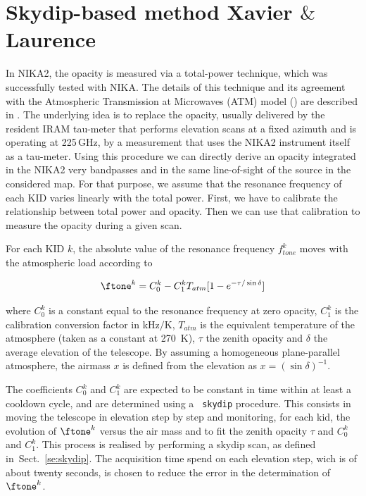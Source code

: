 \section{Skydip-based method {\color{blue} Xavier $\&$ Laurence}}
\label{se:skydip-method}

In NIKA2, the opacity is measured via a total-power technique, which was
successfully tested with NIKA. The details of this technique and its agreement
with the Atmospheric Transmission at Microwaves (ATM) model
(\cite{2001IEEE....49.1683C}) are described in \cite{Catalano:2014nml}. The
underlying idea is to replace the opacity, usually delivered by the resident
IRAM tau-meter that performs elevation scans at a fixed azimuth and is
operating at 225\,GHz, by a measurement that uses the NIKA2 instrument itself
as a tau-meter. Using this procedure we can directly derive an opacity
integrated in the NIKA2 very bandpasses and in the same line-of-sight of the
source in the considered map. For that purpose, we assume that the resonance
frequency of each KID varies linearly with the total power. First, we have to
calibrate the relationship between total power and opacity. Then we can use
that calibration to measure the opacity during a given scan.

For each KID $k$, the absolute value of the resonance frequency
$f_{tone}^k$ moves with the atmospheric load according to

\begin{equation}
\ftone^k  = C_0^k - C_1^k T_{atm}[1-e^{-\tau/\sin\delta}]
\label{eq:skydip}
\end{equation}


where $C_0^k$ is a constant equal to the resonance
frequency at zero opacity, $C_1^k$ is the calibration conversion
factor in kHz$/$K, $T_{atm}$ is the equivalent temperature
of the atmosphere (taken as a constant at 270~K), $\tau$ the zenith
opacity and $\delta$ the average elevation of the telescope.
By assuming a homogeneous plane-parallel atmosphere, the airmass $x$ is defined from the
elevation as $x = \left(\sin\delta\right)^{-1}$. 

The coefficients $C_0^k$ and $C_1^k$ are expected to be constant in
time within at least a cooldown cycle, and are determined using a {\tt
skydip} procedure. This consists in moving the telescope in elevation
step by step and monitoring, for each kid, the evolution of $\ftone^k$
versus the air mass and to fit the zenith opacity $\tau$ and $C_0^k$
and $C_1^k$. This process is realised by performing a skydip scan, as
defined in~Sect.~\ref{se:skydip}. The acquisition time spend on each
elevation step, wich is of about twenty seconds, is chosen to reduce
the error in the determination of $\ftone^k$.

